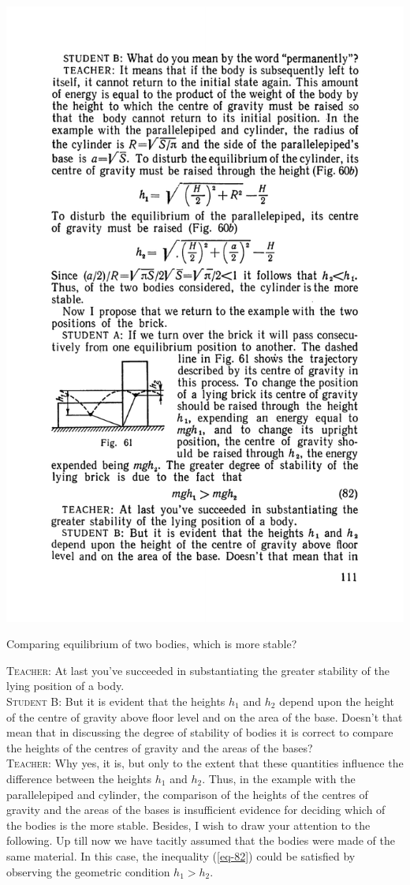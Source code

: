 \documentclass[a4paper,sfsidenotes]{tufte-book}
\begin{document}
\begin{marginfigure}
\centering
\includegraphics[width=\linewidth]{fig-061a.pdf}
\caption{Comparing equilibrium of two bodies, which is more stable?}
\label{fig-61}
\end{marginfigure}
\textsc{Teacher:} At last you've succeeded in substantiating the greater stability of the lying position of a body.
\\
\textsc{Student B:} But it is evident that the heights $h_{1}$ and $h_{2}$ depend upon the height of the centre of gravity above floor level and on the area of the base. Doesn't that mean that in discussing the degree of stability of bodies it is correct to compare the heights of the centres of gravity and the areas of the bases?
\\
\textsc{Teacher:} Why yes, it is, but only to the extent that these quantities influence the difference between the heights $h_{1}$ and $h_{2}$. Thus, in the example with the parallelepiped and cylinder, the comparison of the heights of the centres of gravity and the areas of the bases is insufficient evidence for deciding which of the bodies is the more stable. Besides, I wish to draw your attention to the following. Up till now we have tacitly assumed that the bodies were made of the same material. In this case, the inequality (\ref{eq-82}) could be satisfied by observing the geometric condition $h_{1}>h_{2}$. 
\end{document}
